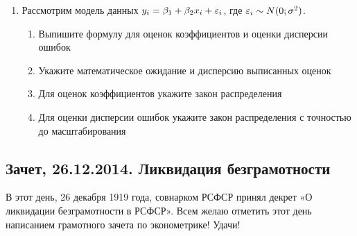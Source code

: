 \documentclass[12pt, a4paper]{article}
\theoremstyle{definition}
\begin{document}
\begin{enumerate}
\item Рассмотрим модель данных $y_i=\beta_1 + \beta_2 x_i + \varepsilon_i$, где $\varepsilon_i \sim N(0;\sigma^2)$.
\begin{enumerate}
\item Выпишите формулу для оценок коэффициентов и оценки дисперсии ошибок
\item Укажите математическое ожидание и дисперсию выписанных оценок
\item Для оценок коэффициентов укажите закон распределения
\item Для оценки дисперсии ошибок укажите закон распределения с точностью до масштабирования
\end{enumerate}

\end{enumerate}

\subsection{Зачет, 26.12.2014. Ликвидация безграмотности}

В этот день, 26 декабря 1919 года, совнарком РСФСР принял декрет «О ликвидации безграмотности в РСФСР». Всем желаю отметить этот день написанием грамотного зачета по эконометрике! Удачи!
\end{document}
